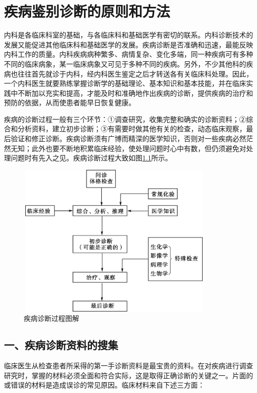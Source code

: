 \chapter{疾病鉴别诊断的原则和方法}

内科是各临床科室的基础，与各临床科和基础医学有密切的联系。内科诊断技术的发展又能促进其他临床科和基础医学的发展。疾病诊断是否准确和迅速，最能反映内科工作的质量。内科疾病病种繁多、病情复杂、变化多端，同一种疾病可有多种不同的临床病象，某一临床病象又可见于多种不同的疾病。另外，不少其他科的疾病也往往首先就诊于内科，经内科医生鉴定之后才转送各有关临床科处理。因此，一个内科医生就要熟练掌握诊断学的基础理论、基本知识和基本技能，并在临床实践中不断加以充实和提高，才能及时和准确地作出疾病的诊断，提供疾病的治疗和预防的依据，从而使患者能早日恢复健康。

疾病的诊断过程一般有三个环节：①调查研究，收集完整和确实的诊断资料；②综合和分析资料，建立初步诊断；③有需要时做其他有关的检查，动态临床观察，最后验证和修正诊断。疾病诊断须有广博而精深的医学知识，否则对一些疾病必然茫然无知；此外也要不断地积累临床经验，使处理问题时心中有数，但仍须避免对处理问题时有先入之见。疾病诊断过程大致如图\ref{fig1-1}所示。

\begin{figure}[!htbp]
 \centering
 \includegraphics[width=3.80208in,height=2.98958in]{./images/Image00004.jpg}
 \captionsetup{justification=centering}
 \caption{疾病诊断过程图解}
 \label{fig1-1}
  \end{figure} 

\section{一、疾病诊断资料的搜集}

临床医生从检查患者所采得的第一手诊断资料是最宝贵的资料。在对疾病进行调查研究时，掌握的材料必须全面和符合实际，这是取得正确诊断的关键之一。片面的或错误的材料是造成误诊的常见原因。临床材料来自下述三方面：


